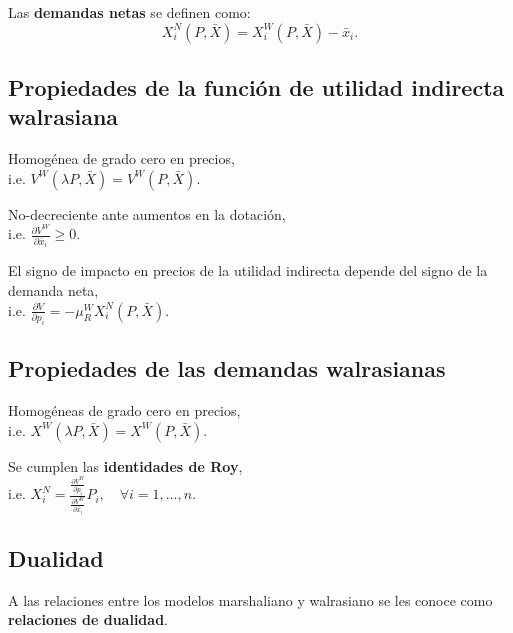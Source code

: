 \documentclass[8pt,a4paper]{extarticle}
\begin{document}
\begin{multicols}{3}
\begin{boxdef}
	Las \textbf{demandas netas} se definen como:
	\[
		X_i^N (P, \bar{X}) = X_i^W (P, \bar{X}) - \bar{x}_i
	.\] 
\end{boxdef}

\subsection{Propiedades de la función de utilidad indirecta walrasiana}

\begin{eqlist}
\item Homogénea de grado cero en precios, \\ i.e. $V^W (\lambda P, \bar{X}) = V^W (P, \bar{X})$.
\item No-decreciente ante aumentos en la dotación, \\ i.e. $\displaystyle \frac{\partial V^W}{\partial \bar{x}_i} \geq 0$.
\item El signo de impacto en precios de la utilidad indirecta depende del signo de la demanda neta, \\ i.e. $\displaystyle \frac{\partial V}{\partial p_i} = - \mu_R^W X_i^N (P, \bar{X})$.
\end{eqlist}

\subsection{Propiedades de las demandas walrasianas}

\begin{eqlist}
\item Homogéneas de grado cero en precios, \\ i.e. $X^W (\lambda P, \bar{X}) = X^W (P, \bar{X})$.
\item Se cumplen las \textbf{identidades de Roy}, \\ i.e. $\displaystyle X^N_i = \frac{\displaystyle \frac{\partial V^W}{\partial p_{i}}}{ \displaystyle \frac{\partial V^W}{\partial \bar{x}_i}} P_i, \quad \forall i = 1, \ldots, n$.
\end{eqlist}

\subsection{Dualidad}

A las relaciones entre los modelos marshaliano y walrasiano se les conoce como \textbf{relaciones de dualidad}.


\end{multicols}
\end{document}
